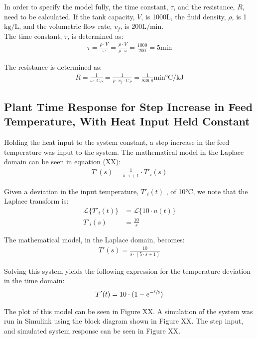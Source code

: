 \documentclass{article}
\begin{document}
In order to specify the model fully, the time constant, $\tau$, and the resistance, $R$, need to be calculated. If the tank capacity, $V$, is 1000$\si{\liter}$, the fluid density, $\rho$, is 1$\si{\kilogram\per\liter}$, and the volumetric flow rate, $v_f$, is 200$\si{\liter\per\minute}$.\\

The time constant, $\tau$, is determined as:
\begin{align}
\tau = \frac{\rho \cdot V}{\omega} = \frac{\rho \cdot V}{\rho \cdot \omega} = \frac{1000}{200} = 5\si{\minute}
\end{align}

The resistance is determined as:
\begin{align}
R = \frac{1}{\omega \cdot C_P} = \frac{1}{\rho \cdot v_f \cdot C_P} = \frac{1}{836.8}\si{\minute\degreeCelsius\per\kilo\joule}
\end{align}
\subsection{Plant Time Response for Step Increase in Feed Temperature, With Heat Input Held Constant}
Holding the heat input to the system constant, a step increase in the feed temperature was input to the system. The mathematical model in the Laplace domain can be seen in equation (XX):
\begin{align}
T'(s) = \frac{1}{5 \cdot \tau + 1} \cdot T'_i(s)
\end{align} 

Given a deviation in the input temperature, $T'_i(t)$ , of 10$\si{\degreeCelsius}$, we note that the Laplace transform is:
\begin{align*}
\mathscr{L}\{T'_i(t)\} &= \mathscr{L}\{10 \cdot u(t)\}\\
T'_i(s) &= \frac{10}{s}
\end{align*}

The mathematical model, in the Laplace domain, becomes:
\begin{align}
T'(s) = \frac{10}{s \cdot (5 \cdot s + 1)}
\end{align}

Solving this system yields the following expression for the temperature deviation in the time domain:
\begin{align}
T'(t) = 10 \cdot (1 - e^{-\sfrac{t}{5}})
\end{align}

The plot of this model can be seen in Figure XX. A simulation of the system was run in Simulink using the block diagram shown in Figure XX. The step input, and simulated system response can be seen in Figure XX.
\end{document}
